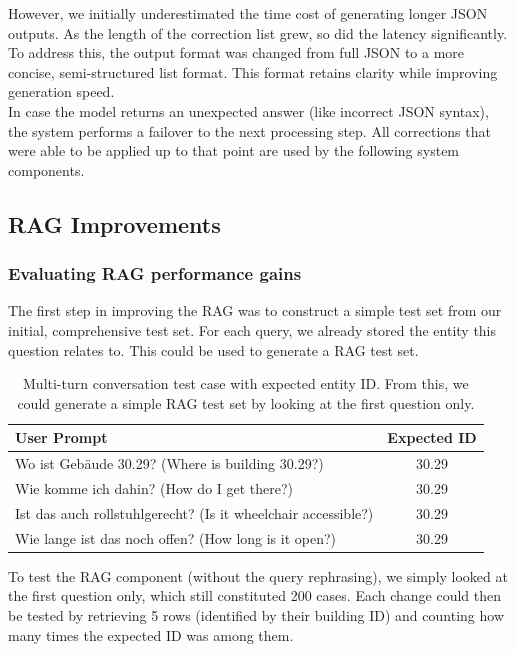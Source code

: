 \documentclass{article}
\begin{document}
However, we initially underestimated the time cost of generating longer JSON outputs. As the length of the correction list grew, so did the latency significantly. To address this, the output format was changed from full JSON to a more concise, semi-structured list format. This format retains clarity while improving generation speed.\\

In case the model returns an unexpected answer (like incorrect JSON syntax), the system performs a failover to the next processing step. All corrections that were able to be applied up to that point are used by the following system components.

\subsection{RAG Improvements} \label{sec:rag_impr}

\subsubsection*{Evaluating RAG performance gains}\label{subsec:rag-dataset}

The first step in improving the RAG was to construct a simple test set from our initial, comprehensive test set. For each query, we already stored the entity this question relates to. This could be used to generate a RAG test set.

\begin{table}[H]
\centering
\begin{tabular}{|p{10cm}|c|}
\hline
\textbf{User Prompt} & \textbf{Expected ID} \\
\hline
Wo ist Gebäude 30.29? (Where is building 30.29?) & 30.29 \\
Wie komme ich dahin? (How do I get there?) & 30.29 \\
Ist das auch rollstuhlgerecht? (Is it wheelchair accessible?) & 30.29 \\
Wie lange ist das noch offen? (How long is it open?) & 30.29 \\
\hline
\end{tabular}
\caption{Multi-turn conversation test case with expected entity ID. From this, we could generate a simple RAG test set by looking at the first question only.}
\end{table}

To test the RAG component (without the query rephrasing), we simply looked at the first question only, which still constituted 200 cases. Each change could then be tested by retrieving 5 rows (identified by their building ID) and counting how many times the expected ID was among them.
\end{document}

